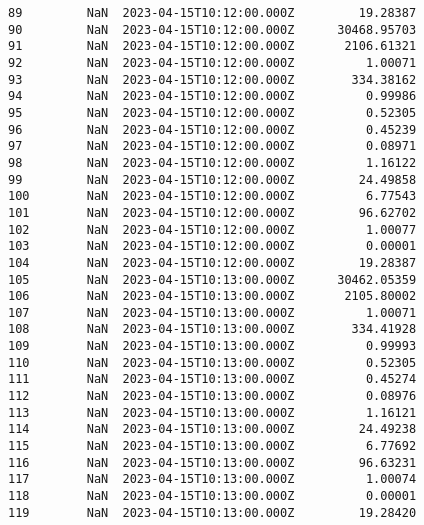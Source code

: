\documentclass[11pt]{article}
\begin{document}
\begin{tcolorbox}[breakable, size=fbox, boxrule=.5pt, pad at break*=1mm, opacityfill=0]
\begin{Verbatim}[commandchars=\\\{\}]
89         NaN  2023-04-15T10:12:00.000Z         19.28387
90         NaN  2023-04-15T10:12:00.000Z      30468.95703
91         NaN  2023-04-15T10:12:00.000Z       2106.61321
92         NaN  2023-04-15T10:12:00.000Z          1.00071
93         NaN  2023-04-15T10:12:00.000Z        334.38162
94         NaN  2023-04-15T10:12:00.000Z          0.99986
95         NaN  2023-04-15T10:12:00.000Z          0.52305
96         NaN  2023-04-15T10:12:00.000Z          0.45239
97         NaN  2023-04-15T10:12:00.000Z          0.08971
98         NaN  2023-04-15T10:12:00.000Z          1.16122
99         NaN  2023-04-15T10:12:00.000Z         24.49858
100        NaN  2023-04-15T10:12:00.000Z          6.77543
101        NaN  2023-04-15T10:12:00.000Z         96.62702
102        NaN  2023-04-15T10:12:00.000Z          1.00077
103        NaN  2023-04-15T10:12:00.000Z          0.00001
104        NaN  2023-04-15T10:12:00.000Z         19.28387
105        NaN  2023-04-15T10:13:00.000Z      30462.05359
106        NaN  2023-04-15T10:13:00.000Z       2105.80002
107        NaN  2023-04-15T10:13:00.000Z          1.00071
108        NaN  2023-04-15T10:13:00.000Z        334.41928
109        NaN  2023-04-15T10:13:00.000Z          0.99993
110        NaN  2023-04-15T10:13:00.000Z          0.52305
111        NaN  2023-04-15T10:13:00.000Z          0.45274
112        NaN  2023-04-15T10:13:00.000Z          0.08976
113        NaN  2023-04-15T10:13:00.000Z          1.16121
114        NaN  2023-04-15T10:13:00.000Z         24.49238
115        NaN  2023-04-15T10:13:00.000Z          6.77692
116        NaN  2023-04-15T10:13:00.000Z         96.63231
117        NaN  2023-04-15T10:13:00.000Z          1.00074
118        NaN  2023-04-15T10:13:00.000Z          0.00001
119        NaN  2023-04-15T10:13:00.000Z         19.28420


\end{Verbatim}
\end{tcolorbox}
\end{document}
